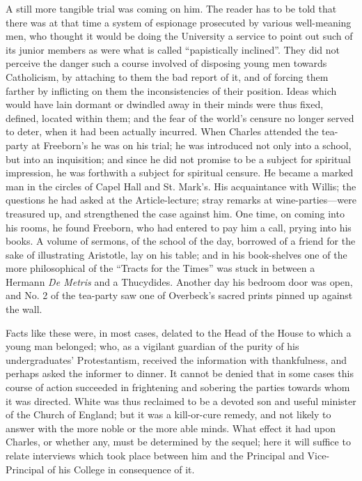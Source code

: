 A still more tangible trial was coming on him. The reader has to be
told that there was at that time a system of espionage prosecuted by
various well-meaning men, who thought it would be doing the University
a service to point out such of its junior members as were what is
called ``papistically inclined''. They did not perceive
the danger such a course involved of disposing young men towards
Catholicism, by attaching to them the bad report of it, and of forcing
them farther by inflicting on them the inconsistencies of their
position. Ideas which would have lain dormant or dwindled away in
their minds were thus fixed, defined, located within them; and the
fear of the world's censure no longer served to deter, when it had
been actually incurred. When Charles attended the tea-party at
Freeborn's he was on his trial; he was introduced not only into a
school, but into an inquisition; and since he did not promise to be a
subject for spiritual impression, he was forthwith a subject for
spiritual censure. He became a marked man in the circles of Capel Hall
and St. Mark's. His acquaintance with Willis; the questions he had
asked at the Article-lecture; stray remarks at wine-parties—were
treasured up, and strengthened the case against him. One time, on
coming into his rooms, he found Freeborn, who had entered to pay him a
call, prying into his books. A volume of sermons, of the school of the
day, borrowed of a friend for the sake of illustrating Aristotle, lay
on his table; and in his book-shelves one of the more philosophical of
the ``Tracts for the Times'' was stuck in between a Hermann \emph{De
Metris} and a Thucydides. Another day his bedroom door was open,
and No. 2 of the tea-party saw one of Overbeck's sacred prints pinned
up against the wall.

Facts like these were, in most cases, delated to the Head of the
House to which a young man belonged; who, as a vigilant guardian of
the purity of his undergraduates' Protestantism, received the
information with thankfulness, and perhaps asked the informer to
dinner. It cannot be denied that in some cases this course of action
succeeded in frightening and sobering the parties towards whom it was
directed. White was thus reclaimed to be a devoted son and useful
minister of the Church of England; but it was a kill-or-cure remedy,
and not likely to answer with the more noble or the more able minds.
What effect it had upon Charles, or whether any, must be determined by
the sequel; here it will suffice to relate interviews which took place
between him and the Principal and Vice-Principal of his College in
consequence of it.

